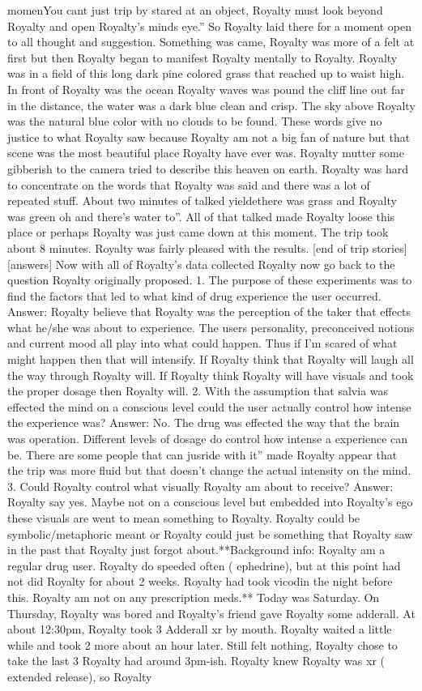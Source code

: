 \documentclass[12pt]{book}
\begin{document}
momenYou cant just trip by stared at an object, Royalty must look beyond Royalty and open Royalty's minds eye.'' So Royalty laid there for a moment open to all thought and suggestion. Something was came, Royalty was more of a felt at first but then Royalty began to manifest Royalty mentally to Royalty. Royalty was in a field of this long dark pine colored grass that reached up to waist high. In front of Royalty was the ocean Royalty waves was pound the cliff line out far in the distance, the water was a dark blue clean and crisp. The sky above Royalty was the natural blue color with no clouds to be found. These words give no justice to what Royalty saw because Royalty am not a big fan of nature but that scene was the most beautiful place Royalty have ever was. Royalty mutter some gibberish to the camera tried to describe this heaven on earth. Royalty was hard to concentrate on the words that Royalty was said and there was a lot of repeated stuff. About two minutes of talked yieldethere was grass and Royalty was green oh and there's water to''. All of that talked made Royalty loose this place or perhaps Royalty was just came down at this moment. The trip took about 8 minutes. Royalty was fairly pleased with the results. [end of trip stories] [answers] Now with all of Royalty's data collected Royalty now go back to the question Royalty originally proposed. 1. The purpose of these experiments was to find the factors that led to what kind of drug experience the user occurred. Answer: Royalty believe that Royalty was the perception of the taker that effects what he/she was about to experience. The users personality, preconceived notions and current mood all play into what could happen. Thus if I'm scared of what might happen then that will intensify. If Royalty think that Royalty will laugh all the way through Royalty will. If Royalty think Royalty will have visuals and took the proper dosage then Royalty will. 2. With the assumption that salvia was effected the mind on a conscious level could the user actually control how intense the experience was? Answer: No. The drug was effected the way that the brain was operation. Different levels of dosage do control how intense a experience can be. There are some people that can jusride with it'' made Royalty appear that the trip was more fluid but that doesn't change the actual intensity on the mind. 3. Could Royalty control what visually Royalty am about to receive? Answer: Royalty say yes. Maybe not on a conscious level but embedded into Royalty's ego these visuals are went to mean something to Royalty. Royalty could be symbolic/metaphoric meant or Royalty could just be something that Royalty saw in the past that Royalty just forgot about.**Background info: Royalty am a regular drug user. Royalty do speeded often ( ephedrine), but at this point had not did Royalty for about 2 weeks. Royalty had took vicodin the night before this. Royalty am not on any prescription meds.** Today was Saturday. On Thursday, Royalty was bored and Royalty's friend gave Royalty some adderall. At about 12:30pm, Royalty took 3 Adderall xr by mouth. Royalty waited a little while and took 2 more about an hour later. Still felt nothing, Royalty chose to take the last 3 Royalty had around 3pm-ish. Royalty knew Royalty was xr ( extended release), so Royalty 
\end{document}
